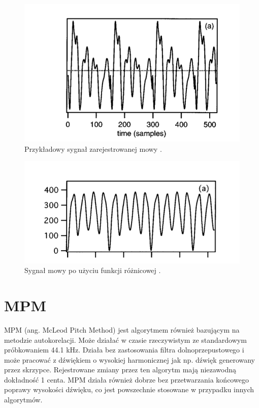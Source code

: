   \begin{figure}[h!]
  \centering
  \includegraphics[width=0.7\linewidth]{rys/yin2}
  \caption{Przykładowy sygnał zarejestrowanej mowy \cite{YIN}.}
  \label{yin_mowa}
\end{figure}

  \begin{figure}[h!]
  \centering
  \includegraphics[width=0.7\linewidth]{rys/yin21}
  \caption{Sygnał mowy po użyciu funkcji różnicowej \cite{YIN}.}
  \label{yin_róznicowa}
\end{figure}

 \section{{MPM}}
 MPM \cite{harvey} (ang. McLeod Pitch Method) jest algorytmem również bazującym na metodzie autokorelacji. Może działać w czasie rzeczywistym ze standardowym próbkowaniem 44.1 kHz. Działa bez zastosowania filtra dolnoprzepustowego i może pracować z dźwiękiem o wysokiej harmonicznej jak np. dźwięk generowany przez skrzypce. Rejestrowane zmiany przez ten algorytm mają niezawodną dokładność 1 centa. MPM działa również dobrze bez przetwarzania końcowego poprawy wysokości dźwięku, co jest powszechnie stosowane w przypadku innych algorytmów.
